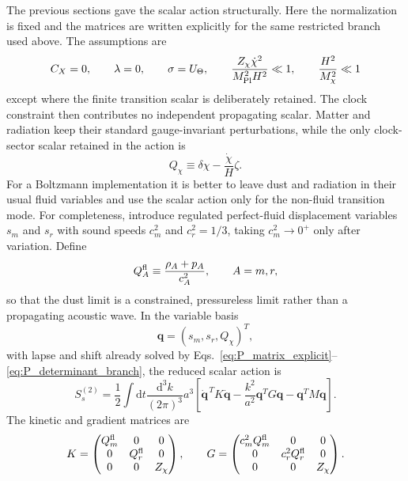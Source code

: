 \documentclass[aps,prd,reprint,nofootinbib,superscriptaddress,longbibliography]{revtex4-2}
\newcommand{\dd}{\mathrm{d}}
\newcommand{\mpl}{M_{\rm Pl}}
\begin{document}
The previous sections gave the scalar action structurally. Here the normalization is fixed and the matrices are written explicitly for the same restricted branch used above. The assumptions are
\begin{equation}
  C_X=0,
  \qquad \lambda=0,
  \qquad \sigma=U_\Theta,
  \qquad \frac{Z_\chi\dot\chi^2}{\mpl^2H^2}\ll1,
  \qquad \frac{H^2}{M_\chi^2}\ll1
\end{equation}
except where the finite transition scalar is deliberately retained. The clock constraint then contributes no independent propagating scalar. Matter and radiation keep their standard gauge-invariant perturbations, while the only clock-sector scalar retained in the action is
\begin{equation}
  Q_\chi\equiv\delta\chi-\frac{\dot\chi}{H}\zeta .
\end{equation}
For a Boltzmann implementation it is better to leave dust and radiation in their usual fluid variables and use the scalar action only for the non-fluid transition mode. For completeness, introduce regulated perfect-fluid displacement variables $s_m$ and $s_r$ with sound speeds $c_m^2$ and $c_r^2=1/3$, taking $c_m^2\rightarrow0^+$ only after variation. Define
\begin{equation}
  Q_A^{\rm fl}\equiv\frac{\rho_A+p_A}{c_A^2},
  \qquad A=m,r,
  \label{eq:Qfluid_def}
\end{equation}
so that the dust limit is a constrained, pressureless limit rather than a propagating acoustic wave. In the variable basis
\begin{equation}
  \bm q=(s_m,s_r,Q_\chi)^T,
\end{equation}
with lapse and shift already solved by Eqs.~\eqref{eq:P_matrix_explicit}--\eqref{eq:P_determinant_branch}, the reduced scalar action is
\begin{equation}
  S_s^{(2)}=\frac12\int\dd t\frac{\dd^3k}{(2\pi)^3}a^3
  \left[\dot{\bm q}^{\,T}K\dot{\bm q}
  -\frac{k^2}{a^2}\bm q^{T}G\bm q
  -\bm q^TM\bm q\right].
  \label{eq:expanded_KGM_action}
\end{equation}
The kinetic and gradient matrices are
\begin{equation}
  K=\begin{pmatrix}
  Q_m^{\rm fl} & 0 & 0\\
  0 & Q_r^{\rm fl} & 0\\
  0 & 0 & Z_\chi
  \end{pmatrix},
  \qquad
  G=\begin{pmatrix}
  c_m^2Q_m^{\rm fl} & 0 & 0\\
  0 & c_r^2Q_r^{\rm fl} & 0\\
  0 & 0 & Z_\chi
  \end{pmatrix} .
  \label{eq:expanded_KG_matrices}
\end{equation}
\end{document}
